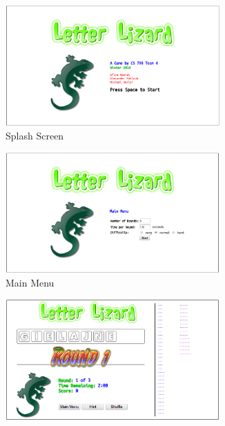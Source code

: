 
\begin{figure}
    \centering
    \begin{subfigure}{0.49\textwidth}
        \includegraphics[width=0.9\textwidth]{../screenshots/LetterLizardJS-SplashScreen2.png}
        \caption{Splash Screen}
        \label{lljssplash}
    \end{subfigure}
    \begin{subfigure}{0.49\textwidth}
        \includegraphics[width=0.9\textwidth]{../screenshots/LetterLizardJS-MainMenu2.png}
        \caption{Main Menu}
        \label{lljsmm}
    \end{subfigure}
    \begin{subfigure}{0.49\textwidth}
        \includegraphics[width=0.9\textwidth]{../screenshots/LetterLizardJS-Round1.png}

\end{subfigure}
\end{figure}
